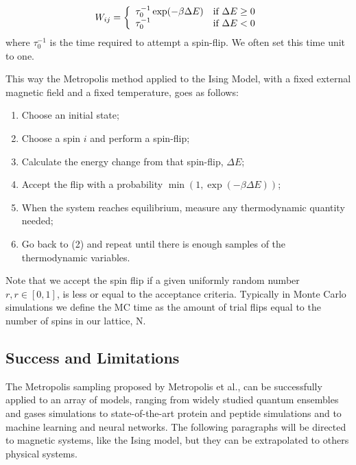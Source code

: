 \begin{equation}
	W_{ij} = \left\{ \begin{array}{ll}  \tau_0^{-1} \exp(-\beta \Delta E)  & \mbox{if } \Delta E \geq 0 \\ \tau_0^{-1} & \mbox{if } \Delta E < 0 \end{array} \right.
\end{equation}
where $\tau_0^{-1}$ is the time required to attempt a spin-flip.  We often set this time unit to one.

This way the Metropolis method applied to the Ising Model, with a fixed external magnetic field and a fixed temperature, goes as follows:

\begin{enumerate}
\item Choose an initial state;
\item Choose a spin $i$ and perform a spin-flip;                                                                                                                                       
\item Calculate the energy change from that spin-flip, $\Delta E$;
\item Accept the flip with a probability $\min \left( 1, \exp(-\beta \Delta E) \right)$; 
\item When the system reaches equilibrium, measure any thermodynamic quantity needed;                                                                                                        
\item Go back to (2) and repeat until there is enough samples of the thermodynamic variables.                                                                                                                    
\end{enumerate}
Note that we accept the spin flip if a given uniformly random number $r, r \in [0,1]$, is less or equal to the acceptance criteria. Typically in Monte Carlo simulations we define the MC time as the amount of trial flips equal to the number of spins in our lattice, N.

\subsection{Success and Limitations}

The Metropolis sampling proposed by Metropolis et al., can be successfully applied to an array of models, ranging from widely studied quantum ensembles and gases simulations to state-of-the-art protein and peptide simulations and to machine learning and neural networks. The following paragraphs will be directed to magnetic systems, like the Ising model, but they can be extrapolated to others physical systems. 

